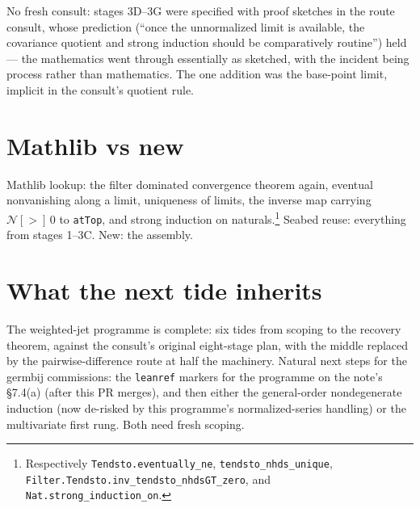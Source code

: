 \documentclass[11pt]{article}
\begin{document}
No fresh consult: stages 3D--3G were specified with proof sketches in
the route consult, whose prediction (``once the unnormalized limit is
available, the covariance quotient and strong induction should be
comparatively routine'') held --- the mathematics went through
essentially as sketched, with the incident being process rather than
mathematics. The one addition was the base-point limit, implicit in
the consult's quotient rule.

\section{Mathlib vs new}

Mathlib lookup: the filter dominated convergence theorem again,
eventual nonvanishing along a limit, uniqueness of limits, the
inverse map carrying $\mathcal{N}[>]\,0$ to \texttt{atTop}, and
strong induction on naturals.\footnote{Respectively
\texttt{Tendsto.eventually\_ne}, \texttt{tendsto\_nhds\_unique},
\texttt{Filter.Tendsto.}\allowbreak\texttt{inv\_tendsto\_nhdsGT\_zero},
and \texttt{Nat.strong\_induction\_on}.} Seabed reuse: everything
from stages 1--3C. New: the assembly.

\section{What the next tide inherits}

The weighted-jet programme is complete: six tides from scoping to the
recovery theorem, against the consult's original eight-stage plan,
with the middle replaced by the pairwise-difference route at half the
machinery. Natural next steps for the germbij commissions: the
\texttt{leanref} markers for the programme on the note's \S7.4(a)
(after this PR merges), and then either the general-order
nondegenerate induction (now de-risked by this programme's
normalized-series handling) or the multivariate first rung. Both need
fresh scoping.
\end{document}
